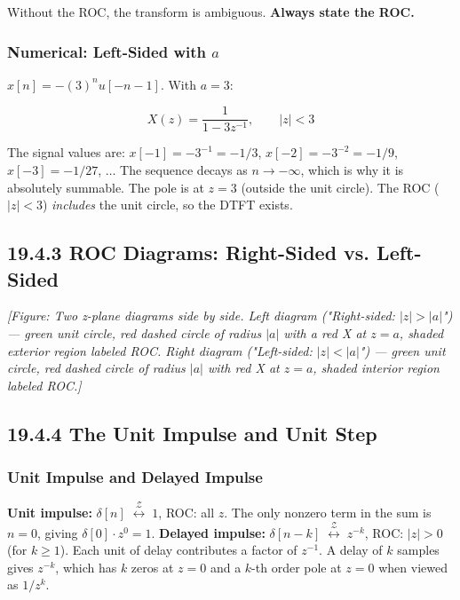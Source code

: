 \documentclass[11pt]{article}
\begin{document}
Without the ROC, the transform is ambiguous. \textbf{Always state the ROC.}

\subsubsection*{Numerical: Left-Sided with $a$}

$x[n] = -(3)^n u[-n-1]$. With $a = 3$:

\[X(z) = \frac{1}{1 - 3z^{-1}}, \qquad |z| < 3\]

The signal values are: $x[-1] = -3^{-1} = -1/3$, $x[-2] = -3^{-2} = -1/9$, $x[-3] = -1/27$, $\ldots$
The sequence decays as $n \to -\infty$, which is why it is absolutely summable.
The pole is at $z = 3$ (outside the unit circle). The ROC ($|z| < 3$) \textit{includes} the unit circle, so the DTFT exists. \checkmark

\subsection*{19.4.3 ROC Diagrams: Right-Sided vs. Left-Sided}

\textit{[Figure: Two z-plane diagrams side by side. Left diagram ("Right-sided: $|z| > |a|$") — green unit circle, red dashed circle of radius $|a|$ with a red X at $z = a$, shaded exterior region labeled ROC. Right diagram ("Left-sided: $|z| < |a|$") — green unit circle, red dashed circle of radius $|a|$ with red X at $z = a$, shaded interior region labeled ROC.]}

\subsection*{19.4.4 The Unit Impulse and Unit Step}

\subsubsection*{Unit Impulse and Delayed Impulse}

\textbf{Unit impulse:} $\delta[n] \;\overset{\mathcal{Z}}{\longleftrightarrow}\; 1$, ROC: all $z$.
The only nonzero term in the sum is $n = 0$, giving $\delta[0] \cdot z^0 = 1$.
\textbf{Delayed impulse:} $\delta[n - k] \;\overset{\mathcal{Z}}{\longleftrightarrow}\; z^{-k}$, ROC: $|z| > 0$ (for $k \geq 1$).
Each unit of delay contributes a factor of $z^{-1}$. A delay of $k$ samples gives $z^{-k}$, which has $k$ zeros at $z = 0$ and a $k$-th order pole at $z = 0$ when viewed as $1/z^k$.
\end{document}
